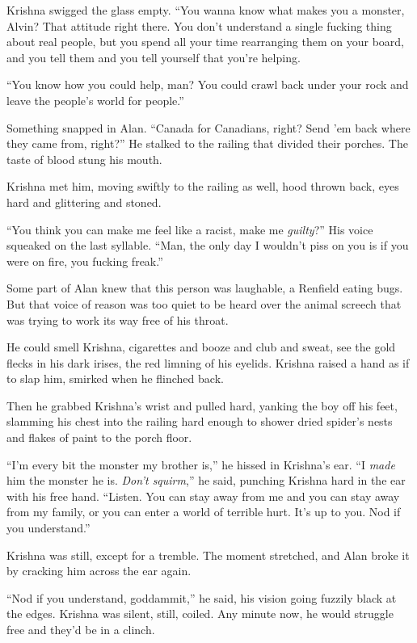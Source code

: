 Krishna swigged the glass empty.  ``You wanna know what makes you a
monster, Alvin?  That attitude right there.  You don't understand a
single fucking thing about real people, but you spend all your time
rearranging them on your board, and you tell them and you tell
yourself that you're helping.

``You know how you could help, man?  You could crawl back under your
rock and leave the people's world for people.''

Something snapped in Alan.  ``Canada for Canadians, right?  Send 'em
back where they came from, right?'' He stalked to the railing that
divided their porches.  The taste of blood stung his mouth.

Krishna met him, moving swiftly to the railing as well, hood thrown
back, eyes hard and glittering and stoned.

``You think you can make me feel like a racist, make me
\textit{guilty}?'' His voice squeaked on the last syllable.  ``Man,
the only day I wouldn't piss on you is if you were on fire, you
fucking freak.''

Some part of Alan knew that this person was laughable, a Renfield
eating bugs.  But that voice of reason was too quiet to be heard over
the animal screech that was trying to work its way free of his throat.

He could smell Krishna, cigarettes and booze and club and sweat, see
the gold flecks in his dark irises, the red limning of his eyelids. 
Krishna raised a hand as if to slap him, smirked when he flinched
back.

Then he grabbed Krishna's wrist and pulled hard, yanking the boy off
his feet, slamming his chest into the railing hard enough to shower
dried spider's nests and flakes of paint to the porch floor.

``I'm every bit the monster my brother is,'' he hissed in Krishna's
ear.  ``I \textit{made} him the monster he is.  \textit{Don't
squirm},'' he said, punching Krishna hard in the ear with his free
hand.  ``Listen.  You can stay away from me and you can stay away from
my family, or you can enter a world of terrible hurt.  It's up to you. 
Nod if you understand.''

Krishna was still, except for a tremble.  The moment stretched, and
Alan broke it by cracking him across the ear again.

``Nod if you understand, goddammit,'' he said, his vision going
fuzzily black at the edges.  Krishna was silent, still, coiled.  Any
minute now, he would struggle free and they'd be in a clinch.

